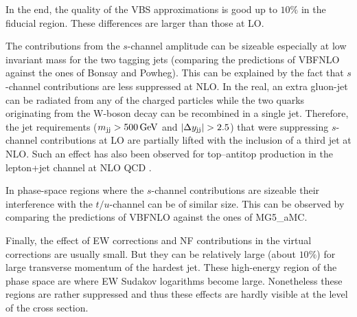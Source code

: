In the end, the quality of the VBS approximations is good up to $10\%$ in the fiducial region.
These differences are larger than those at LO.

The contributions from the $s$-channel amplitude can be sizeable especially at low invariant mass for the two tagging jets (comparing the predictions of {\sc VBFNLO} against the ones of {\sc Bonsay} and {\sc Powheg}).
This can be explained by the fact that $s$-channel contributions are less suppressed at NLO.
In the real, an extra gluon-jet can be radiated from any of the charged particles while the two quarks originating from the W-boson decay can be recombined in a single jet.
Therefore, the jet requirements ($ m_{\text{j} \text{j}} >  500\,\text{GeV}$ and $|\Delta y_{\text{j} \text{j}}| > 2.5$) that were suppressing $s$-channel contributions at LO are partially lifted with the inclusion of a third jet at NLO.
Such an effect has also been observed for top--antitop production in the lepton+jet channel at NLO QCD \cite{Denner:2017kzu}.

In phase-space regions where the $s$-channel contributions are sizeable their interference with the $t/u$-channel can be of similar size.
This can be observed by comparing the predictions of {\sc VBFNLO} against the ones of {\sc MG5\_aMC}.

Finally, the effect of EW corrections and NF contributions in the virtual corrections are usually small.
But they can be relatively large (about $10\%$) for large transverse momentum of the hardest jet.
These high-energy region of the phase space are where EW Sudakov logarithms become large.
Nonetheless these regions are rather suppressed and thus these effects are hardly visible at the level of the cross section.
